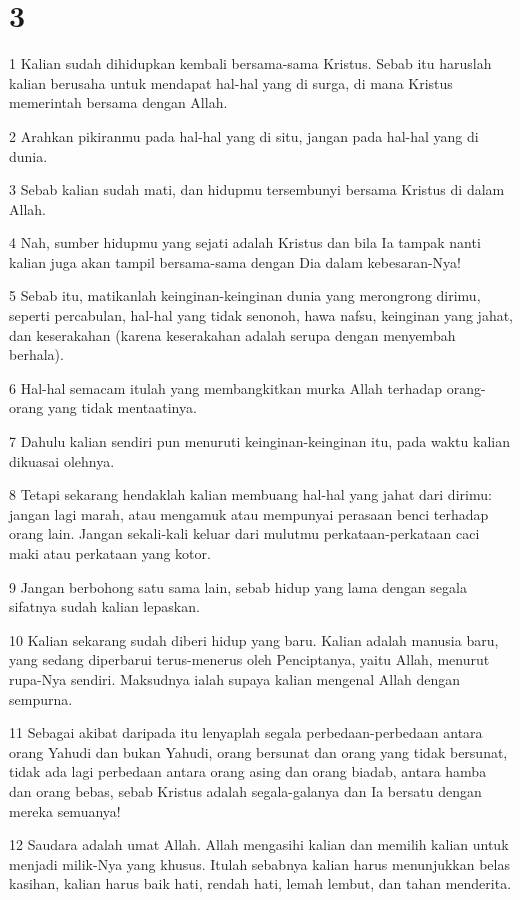 \chapter{3}

\par 1 Kalian sudah dihidupkan kembali bersama-sama Kristus. Sebab itu haruslah kalian berusaha untuk mendapat hal-hal yang di surga, di mana Kristus memerintah bersama dengan Allah.
\par 2 Arahkan pikiranmu pada hal-hal yang di situ, jangan pada hal-hal yang di dunia.
\par 3 Sebab kalian sudah mati, dan hidupmu tersembunyi bersama Kristus di dalam Allah.
\par 4 Nah, sumber hidupmu yang sejati adalah Kristus dan bila Ia tampak nanti kalian juga akan tampil bersama-sama dengan Dia dalam kebesaran-Nya!
\par 5 Sebab itu, matikanlah keinginan-keinginan dunia yang merongrong dirimu, seperti percabulan, hal-hal yang tidak senonoh, hawa nafsu, keinginan yang jahat, dan keserakahan (karena keserakahan adalah serupa dengan menyembah berhala).
\par 6 Hal-hal semacam itulah yang membangkitkan murka Allah terhadap orang-orang yang tidak mentaatinya.
\par 7 Dahulu kalian sendiri pun menuruti keinginan-keinginan itu, pada waktu kalian dikuasai olehnya.
\par 8 Tetapi sekarang hendaklah kalian membuang hal-hal yang jahat dari dirimu: jangan lagi marah, atau mengamuk atau mempunyai perasaan benci terhadap orang lain. Jangan sekali-kali keluar dari mulutmu perkataan-perkataan caci maki atau perkataan yang kotor.
\par 9 Jangan berbohong satu sama lain, sebab hidup yang lama dengan segala sifatnya sudah kalian lepaskan.
\par 10 Kalian sekarang sudah diberi hidup yang baru. Kalian adalah manusia baru, yang sedang diperbarui terus-menerus oleh Penciptanya, yaitu Allah, menurut rupa-Nya sendiri. Maksudnya ialah supaya kalian mengenal Allah dengan sempurna.
\par 11 Sebagai akibat daripada itu lenyaplah segala perbedaan-perbedaan antara orang Yahudi dan bukan Yahudi, orang bersunat dan orang yang tidak bersunat, tidak ada lagi perbedaan antara orang asing dan orang biadab, antara hamba dan orang bebas, sebab Kristus adalah segala-galanya dan Ia bersatu dengan mereka semuanya!
\par 12 Saudara adalah umat Allah. Allah mengasihi kalian dan memilih kalian untuk menjadi milik-Nya yang khusus. Itulah sebabnya kalian harus menunjukkan belas kasihan, kalian harus baik hati, rendah hati, lemah lembut, dan tahan menderita.
